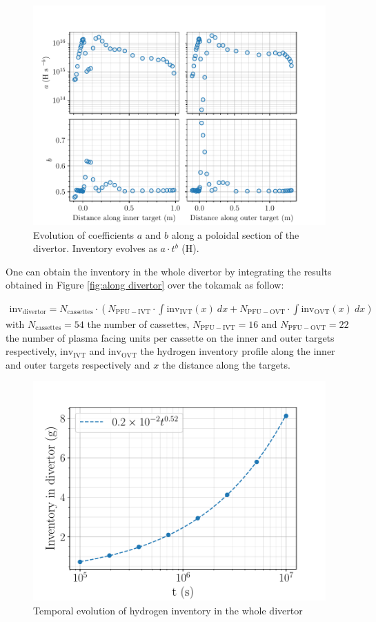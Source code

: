 \begin{figure} [h]
    \centering
    \includegraphics[width=0.8\linewidth]{Figures/Chapter3/monoblocks/parametric_study/a_b_along_div.pdf}
    \caption{Evolution of coefficients $a$ and $b$ along a poloidal section of the divertor. Inventory evolves as $a\cdot t^b$ (H).}
    \label{fig:a_b_along_div}
\end{figure}

One can obtain the inventory in the whole divertor by integrating the results obtained in Figure \ref{fig:along divertor} over the tokamak as follow:

\begin{eqnarray}
    \mathrm{inv_{divertor}} = N_\mathrm{cassettes}
    \cdot \left(N_\mathrm{PFU-IVT} \cdot \int \mathrm{inv_{IVT}}(x)\: dx + N_\mathrm{PFU-OVT} \cdot\int \mathrm{inv_{OVT}}(x) \: dx \right)
\end{eqnarray}
with $N_\mathrm{cassettes}=54$ the number of cassettes, $N_\mathrm{PFU-IVT}=16$ and $N_\mathrm{PFU-OVT}=22$ the number of plasma facing units per cassette on the inner and outer targets respectively, $\mathrm{inv_{IVT}}$ and $\mathrm{inv_{OVT}}$ the hydrogen inventory profile along the inner and outer targets respectively and $x$ the distance along the targets.

\begin{figure} [h]
    \centering
    \includegraphics[width=0.5\linewidth]{Figures/Chapter3/monoblocks/parametric_study/inventory_divertor.pdf}
    \caption{Temporal evolution of hydrogen inventory in the whole divertor}
    \label{fig:inventory divertor}
\end{figure}

